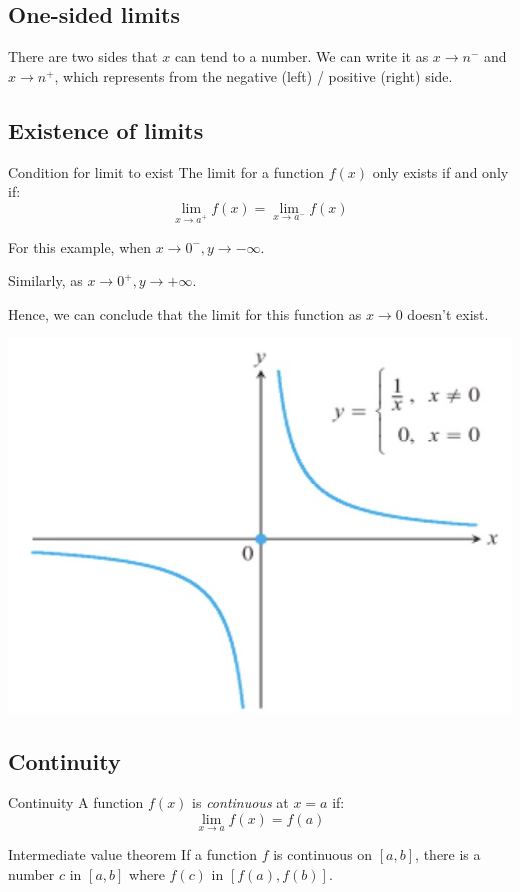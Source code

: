 \documentclass{article}
\begin{document}
\subsection{One-sided limits}
There are two sides that $x$ can tend to a number. We can write it as $x\to n^-$ and $x\to n^+$, which represents from the negative (left) / positive (right) side.

\subsection{Existence of limits}
\begin{theorem}
    {Condition for limit to exist}
    The limit for a function $f(x)$ only exists if and only if:
    \[\lim_{x\to a^+}f(x)=\lim_{x\to a^-}f(x)\]
\end{theorem}

\begin{minipage}{0.65\textwidth}
    For this example, when $x\to 0^-, y\to -\infty$.

    Similarly, as $x\to 0^+, y\to +\infty$.

    Hence, we can conclude that the limit for this function as $x\to 0$ doesn't exist.
\end{minipage}
\hfill
\begin{minipage}{0.25\textwidth}
    \includegraphics[width=\textwidth]{img/lim3.jpg}
\end{minipage}

\subsection{Continuity}
\begin{theorem}
    {Continuity}
    A function $f(x)$ is \emph{continuous} at $x=a$ if:
    \[\mathop {\lim }\limits_{x \to a} f\left( x \right) = f\left( a \right)\]
\end{theorem}
\begin{theorem}
    {Intermediate value theorem}
    If a function $f$ is continuous on $[a, b]$, there is a number $c$ in $[a, b]$ where $f(c)$ in $[f(a), f(b)]$.
\end{theorem}
\end{document}
